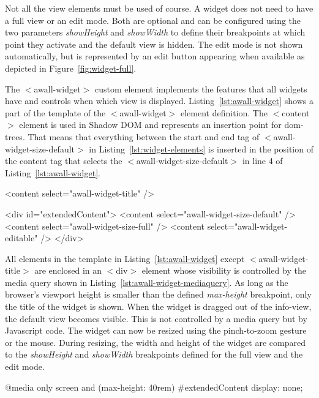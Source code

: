 \documentclass{sigchi}
\begin{document}
Not all the view elements must be used of course.
A widget does not need to have a full view or an edit mode.
Both are optional and can be configured using the two parameters \textit{showHeight} and \textit{showWidth} to define their breakpoints at which point they activate and the default view is hidden.
The edit mode is not shown automatically, but is represented by an edit button appearing when available as depicted in Figure~\ref{fig:widget-full}.


The $<$awall-widget$>$ custom element implements the features that all widgets have and controls when which view is displayed.
Listing~\ref{lst:awall-widget} shows a part of the template of the $<$awall-widget$>$ element definition.
The $<$content$>$ element is used in Shadow DOM and represents an insertion point for \gls{dom}-trees.
That means that everything between the start and end tag of $<$awall-widget-size-default$>$ in Listing~\ref{lst:widget-elements} is inserted in the position of the content tag that selects the $<$awall-widget-size-default$>$ in line 4 of Listing~\ref{lst:awall-widget}.


\begin{code}[caption={Part of the $<$awall-widget$>$'s template using insertion points for the different HTML tags.},label=lst:awall-widget]
<content select="awall-widget-title" />

<div id="extendedContent">
  <content select="awall-widget-size-default" />
  <content select="awall-widget-size-full" />
  <content select="awall-widget-editable" />
</div>
\end{code}


All elements in the template in Listing~\ref{lst:awall-widget} except $<$awall-widget-title$>$ are enclosed in an $<$div$>$ element whose visibility is controlled by the media query shown in Listing~\ref{lst:awall-widget-mediaquery}.
As long as the browser's viewport height is smaller than the defined \textit{max-height} breakpoint, only the title of the widget is shown.
When the widget is dragged out of the info-view, the default view becomes visible. This is not controlled by a media query but by Javascript code.
The widget can now be resized using the pinch-to-zoom gesture or the mouse.
During resizing, the width and height of the widget are compared to the \textit{showHeight} and \textit{showWidth} breakpoints defined for the full view and the edit mode.

\begin{code}[caption={Media Query hiding all the views except the title when the screen is small enough.},label=lst:awall-widget-mediaquery]
@media only screen and (max-height: 40rem) {
  #extendedContent {
    display: none;
  }
}
\end{code}
\end{document}
